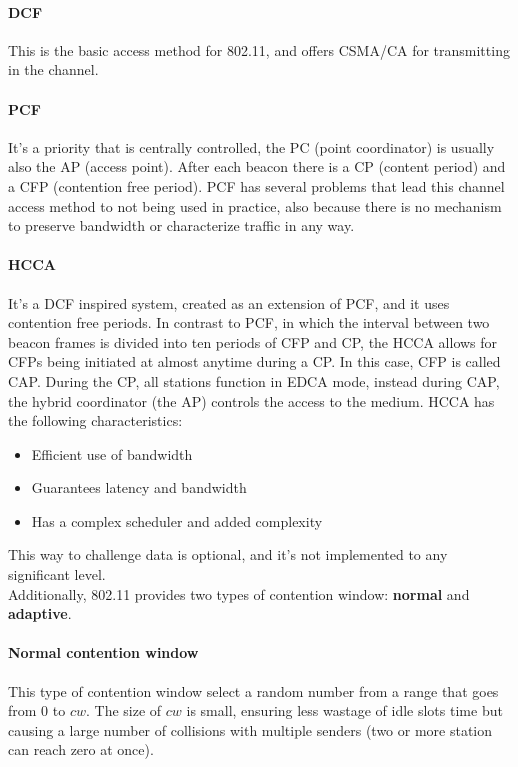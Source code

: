 \paragraph*{DCF} This is the basic access method for 802.11, and offers CSMA/CA
for transmitting in the channel.

\paragraph*{PCF} It's a priority that is centrally controlled, the PC (point
coordinator) is usually also the AP (access point).
After each beacon there is a CP (content period) and a CFP (contention free
period). PCF has several problems that lead this channel access method to not
being used in practice, also because there is no mechanism to preserve bandwidth
or characterize traffic in any way.

\paragraph*{HCCA} It's a DCF inspired system, created as an extension of PCF,
and it uses contention free periods. In contrast to PCF, in which the interval
between two beacon frames is divided into ten periods of CFP and CP, the HCCA
allows for CFPs being initiated at almost anytime during a CP. In this case,
CFP is called CAP. During the CP, all stations function in EDCA mode, instead
during CAP, the hybrid coordinator (the AP) controls the access to the medium.
HCCA has the following characteristics:
\begin{itemize}
\item Efficient use of bandwidth
\item Guarantees latency and bandwidth
\item Has a complex scheduler and added complexity
\end{itemize}

This way to challenge data is optional, and it's not implemented to any
significant level.\\[5pt]


\noindent Additionally, 802.11 provides two types of contention window:
\textbf{normal} and
\textbf{adaptive}.

\paragraph*{Normal contention window} This type of contention window select a
random number from a range that goes from 0 to $cw$. The size of $cw$ is small, ensuring less
wastage of idle slots time but causing a large number of collisions with
multiple senders (two or more station can reach zero at once).

